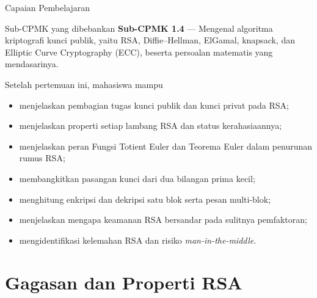 \documentclass[aspectratio=169,11pt]{beamer}
\begin{document}
\begin{frame}{Capaian Pembelajaran}
    \begin{block}{Sub-CPMK yang dibebankan}
        \footnotesize
        \textbf{Sub-CPMK 1.4} --- Mengenal algoritma kriptografi kunci
        publik, yaitu RSA, Diffie--Hellman, ElGamal, knapsack, dan Elliptic
        Curve Cryptography (ECC), beserta persoalan matematis yang
        mendasarinya.
    \end{block}
    \vspace{0.1cm}
    \begin{exampleblock}{Setelah pertemuan ini, mahasiswa mampu}
        \footnotesize
        \begin{itemize}
            \item menjelaskan pembagian tugas kunci publik dan kunci privat
                  pada RSA;
            \item menjelaskan properti setiap lambang RSA dan status
                  kerahasiaannya;
            \item menjelaskan peran Fungsi Totient Euler dan Teorema Euler
                  dalam penurunan rumus RSA;
            \item membangkitkan pasangan kunci dari dua bilangan prima kecil;
            \item menghitung enkripsi dan dekripsi satu blok serta pesan
                  multi-blok;
            \item menjelaskan mengapa keamanan RSA bersandar pada sulitnya
                  pemfaktoran;
            \item mengidentifikasi kelemahan RSA dan risiko
                  \textit{man-in-the-middle}.
        \end{itemize}
    \end{exampleblock}
\end{frame}

\section{Gagasan dan Properti RSA}
\end{document}
